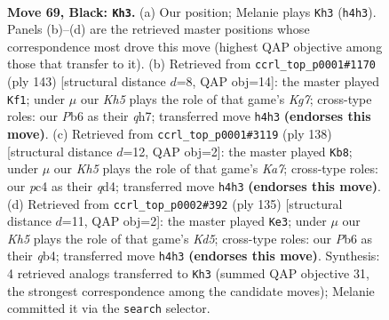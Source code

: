 \documentclass[11pt]{article}
\begin{document}
\clearpage

\begin{figure}[p]\centering
\begin{subfigure}{0.46\textwidth}\centering
\resizebox{\linewidth}{!}{%
\newchessgame
\chessboard[
  setfen={8/8/pp6/8/q1P4k/2K5/8/8 b - - 7 69},
  showmover=false,
  pgfstyle=straightmove, color=movearrow, markmove={h4-h3}
]}
\caption{}
\end{subfigure}\hfill
\begin{subfigure}{0.46\textwidth}\centering
\resizebox{\linewidth}{!}{%
\newchessgame
\chessboard[
  setfen={8/7Q/1K6/p7/8/1Pq5/6k1/8 b - - 3 72},
  showmover=false,
  pgfstyle=straightmove, color=movearrow, markmove={g2-f1}
]}
\caption{}
\end{subfigure}
\\[4pt]
\begin{subfigure}{0.46\textwidth}\centering
\resizebox{\linewidth}{!}{%
\newchessgame
\chessboard[
  setfen={8/K7/8/P7/3q4/Q4p2/8/5k2 w - - 6 70},
  showmover=false,
  pgfstyle=straightmove, color=movearrow, markmove={a7-b8}
]}
\caption{}
\end{subfigure}\hfill
\begin{subfigure}{0.46\textwidth}\centering
\resizebox{\linewidth}{!}{%
\newchessgame
\chessboard[
  setfen={8/8/4q1P1/8/1Q1k4/8/4p3/7K b - - 10 68},
  showmover=false,
  pgfstyle=straightmove, color=movearrow, markmove={d4-e3}
]}
\caption{}
\end{subfigure}
\caption{\textbf{Move 69, Black: \texttt{Kh3}.} (a) Our position; Melanie plays \texttt{Kh3} (\texttt{h4h3}). Panels (b)--(d) are the retrieved master positions whose correspondence most drove this move (highest QAP objective among those that transfer to it). (b) Retrieved from \texttt{ccrl\_top\_p0001\#1170} (ply 143) [structural distance $d$=8, QAP obj=14]: the master played \texttt{Kf1}; under $\mu$ our \emph{Kh5} plays the role of that game's \emph{Kg7}; cross-type roles: our \emph{P}b6 as their \emph{q}h7; transferred move \texttt{h4h3} \textbf{(endorses this move)}. (c) Retrieved from \texttt{ccrl\_top\_p0001\#3119} (ply 138) [structural distance $d$=12, QAP obj=2]: the master played \texttt{Kb8}; under $\mu$ our \emph{Kh5} plays the role of that game's \emph{Ka7}; cross-type roles: our \emph{p}c4 as their \emph{q}d4; transferred move \texttt{h4h3} \textbf{(endorses this move)}. (d) Retrieved from \texttt{ccrl\_top\_p0002\#392} (ply 135) [structural distance $d$=11, QAP obj=2]: the master played \texttt{Ke3}; under $\mu$ our \emph{Kh5} plays the role of that game's \emph{Kd5}; cross-type roles: our \emph{P}b6 as their \emph{q}b4; transferred move \texttt{h4h3} \textbf{(endorses this move)}. Synthesis: 4 retrieved analogs transferred to \texttt{Kh3} (summed QAP objective 31, the strongest correspondence among the candidate moves); Melanie committed it via the \texttt{search} selector.}
\label{fig:thought-m137}
\end{figure}
\end{document}
